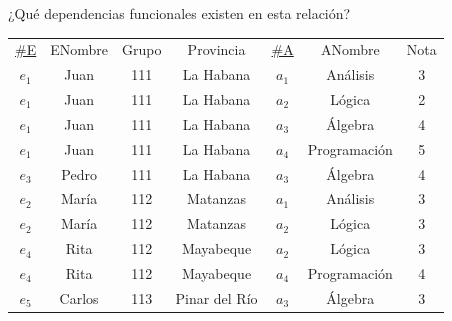 \begin{frame}{¿Qu\'e dependencias funcionales existen en esta relaci\'on?}
    \centering
    \begin{tabular}{ccccccc}
        \underline{\#E} & ENombre & Grupo & Provincia & \underline{\#A} & ANombre & Nota\\
        $e_1$ & Juan & 111 & La Habana & $a_1$ & An\'alisis & 3\\
        $e_1$ & Juan & 111 & La Habana & $a_2$ & L\'ogica & 2\\
        $e_1$ & Juan & 111 & La Habana  & $a_3$ & \'Algebra & 4\\
        $e_1$ & Juan & 111 & La Habana & $a_4$ & Programaci\'on & 5\\
        $e_3$ & Pedro & 111 & La Habana & $a_3$ & \'Algebra & 4\\
        $e_2$ & Mar\'ia & 112 &  Matanzas & $a_1$ & An\'alisis & 3\\
        $e_2$ & Mar\'ia &  112 & Matanzas & $a_2$ & L\'ogica & 3\\
        $e_4$ & Rita & 112 & Mayabeque & $a_2$ & L\'ogica & 3\\
        $e_4$ & Rita &  112 & Mayabeque & $a_4$ & Programaci\'on & 4\\
        $e_5$ & Carlos &  113 & Pinar del R\'io & $a_3$ & \'Algebra & 3
    \end{tabular}
\end{frame}

